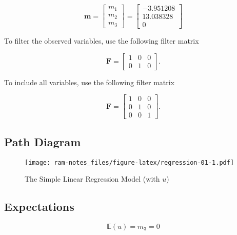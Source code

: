 \documentclass[
]{book}
\begin{document}
\begin{equation}
  \mathbf{m}
  =
  \begin{bmatrix}
    m_1 \\
    m_2 \\
    m_3
  \end{bmatrix}
  =
  \begin{bmatrix}
    -3.951208 \\
    13.038328 \\
    0
  \end{bmatrix}
\end{equation}

To filter the observed variables, use the following filter matrix

\begin{equation}
  \mathbf{F}
  =
  \begin{bmatrix}
    1 & 0 & 0 \\
    0 & 1 & 0
  \end{bmatrix} .
\end{equation}

To include all variables, use the following filter matrix

\begin{equation}
  \mathbf{F}
  =
  \begin{bmatrix}
    1 & 0 & 0 \\
    0 & 1 & 0 \\
    0 & 0 & 1
  \end{bmatrix} .
\end{equation}

\hypertarget{path-diagram}{%
\subsection{Path Diagram}\label{path-diagram}}

\begin{figure}
\centering
\texttt{[image: ram-notes\_files/figure-latex/regression-01-1.pdf]}
\caption{\label{fig:regression-01}The Simple Linear Regression Model (with \(u\))}
\end{figure}

\hypertarget{expectations}{%
\subsection{Expectations}\label{expectations}}

\begin{equation}
  \mathbb{E}
  \left(
    u
  \right)
  =
  m_3
  =
  0
\end{equation}
\end{document}
